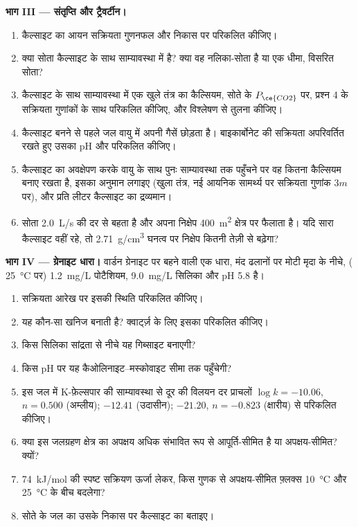 \begin{problem}
\medskip\noindent\textbf{भाग III --- संतृप्ति और ट्रैवर्टीन।}
\begin{enumerate}[resume]
\item कैल्साइट का आयन सक्रियता गुणनफल और 
  निकास पर परिकलित कीजिए।
\item क्या सोता कैल्साइट के साथ साम्यावस्था में है? क्या वह नलिका-सोता है या
  एक धीमा, विसरित सोता?
\item कैल्साइट के साथ साम्यावस्था में एक खुले तंत्र का कैल्सियम, सोते के
  $P_{\ce{CO2}}$ पर, प्रश्न 4 के सक्रियता गुणांकों के साथ परिकलित कीजिए,
  और विश्लेषण से तुलना कीजिए।
\item कैल्साइट बनने से पहले जल वायु में अपनी गैसें छोड़ता है। बाइकार्बोनेट की सक्रियता
  अपरिवर्तित रखते हुए उसका pH और  परिकलित कीजिए।
\item कैल्साइट का अवक्षेपण करके वायु के साथ पुनः साम्यावस्था तक पहुँचने पर वह कितना कैल्सियम
  बनाए रखता है, इसका अनुमान लगाइए (खुला तंत्र, नई आयनिक सामर्थ्य पर सक्रियता गुणांक
  $3m$ पर), और प्रति लीटर कैल्साइट का द्रव्यमान।
\item सोता \qty{2.0}{L/s} की दर से बहता है और अपना निक्षेप
  \qty{400}{m^2} क्षेत्र पर फैलाता है। यदि सारा कैल्साइट वहीं रहे, तो
  \qty{2.71}{g/cm^3} घनत्व पर निक्षेप कितनी तेज़ी से बढ़ेगा?
\end{enumerate}

\medskip\noindent\textbf{भाग IV --- ग्रेनाइट धारा।} वार्डन ग्रेनाइट पर बहने वाली एक धारा,
मंद ढलानों पर मोटी मृदा के नीचे, (
\qty{25}{\celsius} पर) \qty{1.2}{mg/L} पोटैशियम, \qty{9.0}{mg/L} सिलिका और
pH 5.8 है।
\begin{enumerate}[resume]
\item सक्रियता आरेख पर इसकी स्थिति परिकलित कीजिए।
\item यह कौन-सा खनिज बनाती है? क्वार्ट्ज़ के लिए इसका  परिकलित कीजिए।
\item किस सिलिका सांद्रता से नीचे यह गिब्साइट बनाएगी?
\item किस pH पर यह कैओलिनाइट--मस्कोवाइट सीमा तक पहुँचेगी?
\item इस जल में K-फ़ेल्सपार की साम्यावस्था से दूर की विलयन दर
  प्राचलों $\log k = -10.06$, $n = 0.500$ (अम्लीय);
  $-12.41$ (उदासीन); $-21.20$, $n = -0.823$ (क्षारीय) से परिकलित कीजिए।
\item क्या इस जलग्रहण क्षेत्र का अपक्षय अधिक संभावित रूप से आपूर्ति-सीमित है या
  अपक्षय-सीमित? क्यों?
\item \qty{74}{kJ/mol} की स्पष्ट सक्रियण ऊर्जा लेकर, किस गुणक से
  अपक्षय-सीमित फ़्लक्स \qty{10}{\celsius} और
  \qty{25}{\celsius} के बीच बदलेगा?
\item सोते के जल का उसके निकास पर कैल्साइट का 
  बताइए।
\end{enumerate}
\end{problem}

